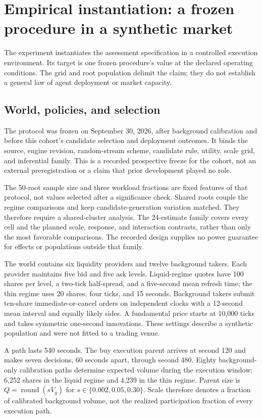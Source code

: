 \documentclass[10pt,letterpaper]{article}
\begin{document}
\section{Empirical instantiation: a frozen procedure in a synthetic market}
The experiment instantiates the assessment specification in a controlled execution environment. Its target is one frozen procedure's value at the declared operating conditions. The grid and root population delimit the claim; they do not establish a general law of agent deployment or market capacity.
\subsection{World, policies, and selection}
The protocol was frozen on September 30, 2026, after background calibration and before this cohort's candidate selection and deployment outcomes. It binds the source, engine revision, random-stream scheme, candidate rule, utility, scale grid, and inferential family. This is a recorded prospective freeze for the cohort, not an external preregistration or a claim that prior development played no role.

The 50-root sample size and three workload fractions are fixed features of that protocol, not values selected after a significance check. Shared roots couple the regime comparisons and keep candidate-generation variation matched. They therefore require a shared-cluster analysis. The 24-estimate family covers every cell and the planned scale, response, and interaction contrasts, rather than only the most favorable comparisons. The recorded design supplies no power guarantee for effects or populations outside that family.

The world contains six liquidity providers and twelve background takers. Each provider maintains five bid and five ask levels. Liquid-regime quotes have 100 shares per level, a two-tick half-spread, and a five-second mean refresh time; the thin regime uses 20 shares, four ticks, and 15 seconds. Background takers submit ten-share immediate-or-cancel orders on independent clocks with a 12-second mean interval and equally likely sides. A fundamental price starts at 10,000 ticks and takes symmetric one-second innovations. These settings describe a synthetic population and were not fitted to a trading venue.

A path lasts 540 seconds. The buy execution parent arrives at second 120 and makes seven decisions, 60 seconds apart, through second 480. Eighty background-only calibration paths determine expected volume during the execution window: 6,252 shares in the liquid regime and 4,239 in the thin regime. Parent size is $Q=\operatorname{round}(sV_g)$ for $s\in\{0.002,0.05,0.30\}$. Scale therefore denotes a fraction of calibrated background volume, not the realized participation fraction of every execution path.
\end{document}
